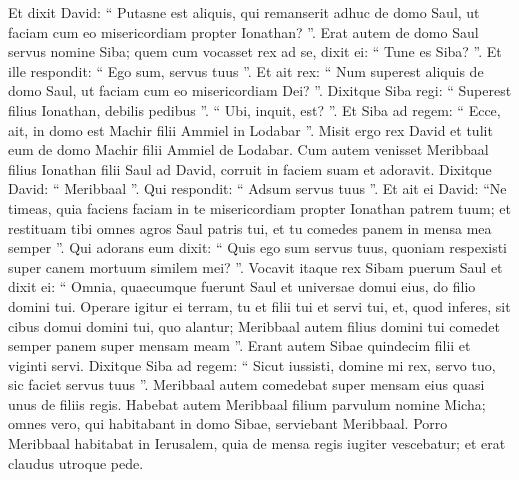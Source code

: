 \begin{biblechapter}
\begin{biblechapter}
\begin{biblechapter}
\begin{biblechapter}
\begin{biblechapter}
\begin{biblechapter}
\begin{biblechapter}
\begin{biblechapter}
\begin{biblechapter}
\verse Et dixit David: “ Putasne est aliquis, qui remanserit adhuc de domo Saul, ut faciam cum eo misericordiam propter Ionathan? ”. 
\verse Erat autem de domo Saul servus nomine Siba; quem cum vocasset rex ad se, dixit ei: “ Tune es Siba? ”. Et ille respondit: “ Ego sum, servus tuus ”. 
\verse Et ait rex: “ Num superest aliquis de domo Saul, ut faciam cum eo misericordiam Dei? ”. Dixitque Siba regi: “ Superest filius Ionathan, debilis pedibus ”. 
\verse “ Ubi, inquit, est? ”. Et Siba ad regem: “ Ecce, ait, in domo est Machir filii Ammiel in Lodabar ”. 
\verse Misit ergo rex David et tulit eum de domo Machir filii Ammiel de Lodabar.
 \verse Cum autem venisset Meribbaal filius Ionathan filii Saul ad David, corruit in faciem suam et adoravit. Dixitque David: “ Meribbaal ”. Qui respondit: “ Adsum servus tuus ”. 
\verse Et ait ei David: “Ne timeas, quia faciens faciam in te misericordiam propter Ionathan patrem tuum; et restituam tibi omnes agros Saul patris tui, et tu comedes panem in mensa mea semper ”. 
\verse Qui adorans eum dixit: “ Quis ego sum servus tuus, quoniam respexisti super canem mortuum similem mei? ”.
 \verse Vocavit itaque rex Sibam puerum Saul et dixit ei: “ Omnia, quaecumque fuerunt Saul et universae domui eius, do filio domini tui. 
\verse Operare igitur ei terram, tu et filii tui et servi tui, et, quod inferes, sit cibus domui domini tui, quo alantur; Meribbaal autem filius domini tui comedet semper panem super mensam meam ”. Erant autem Sibae quindecim filii et viginti servi. 
\verse Dixitque Siba ad regem: “ Sicut iussisti, domine mi rex, servo tuo, sic faciet servus tuus ”. Meribbaal autem comedebat super mensam eius quasi unus de filiis regis. 
\verse Habebat autem Meribbaal filium parvulum nomine Micha; omnes vero, qui habitabant in domo Sibae, serviebant Meribbaal. 
\verse Porro Meribbaal habitabat in Ierusalem, quia de mensa regis iugiter vescebatur; et erat claudus utroque pede.
 

\end{biblechapter}
\end{biblechapter}
\end{biblechapter}
\end{biblechapter}
\end{biblechapter}
\end{biblechapter}
\end{biblechapter}
\end{biblechapter}
\end{biblechapter}
